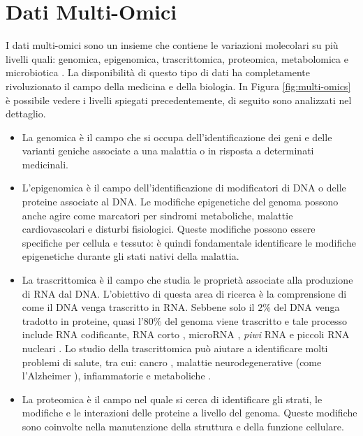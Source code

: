 \documentclass[12pt,italian]{report}
\begin{document}
	\section{Dati Multi-Omici}
	I dati multi-omici sono un insieme che contiene le variazioni molecolari su più livelli quali: genomica, epigenomica, trascrittomica, proteomica, metabolomica e microbiotica \cite{Hasin2017}. La disponibilità di questo tipo di dati ha completamente rivoluzionato il campo della medicina e della biologia. 
	In Figura \ref{fig:multi-omics} è possibile vedere i livelli spiegati precedentemente, di seguito sono analizzati nel dettaglio.
	\begin{itemize}
		\item La genomica è il campo che si occupa dell'identificazione dei geni e delle varianti geniche associate a una malattia o in risposta a determinati medicinali.
		
		\item L'epigenomica è il campo dell'identificazione di modificatori di DNA o delle proteine associate al DNA. Le modifiche epigenetiche del genoma possono anche agire come marcatori per sindromi metaboliche, malattie cardiovascolari e disturbi fisiologici. Queste modifiche possono essere specifiche per cellula e tessuto: è quindi fondamentale identificare le modifiche epigenetiche durante gli stati nativi della malattia.
		
		\item La trascrittomica è il campo che studia le proprietà associate alla produzione di RNA dal DNA. L'obiettivo di questa area di ricerca è la comprensione di come il DNA venga trascritto in RNA. Sebbene solo il $2\%$ del DNA venga tradotto in proteine, quasi l'$80\%$ del genoma viene trascritto e tale processo include RNA codificante, RNA corto \cite{lee2004short}, microRNA \cite{lu2018microrna}, \textit{piwi} RNA \cite{ozata2019piwi} e piccoli RNA nucleari \cite{cullen2003nuclear}. Lo studio della trascrittomica può aiutare a identificare molti problemi di salute, tra cui: cancro \cite{sager2015transcriptomics}, malattie neurodegenerative (come l'Alzheimer \cite{papassotiropoulos2006genetics}), infiammatorie \cite{chan2018delineating} e metaboliche \cite{stenton2020diagnosis}.
		
		\item  La proteomica è il campo nel quale si cerca di identificare gli strati, le modifiche e le interazioni delle proteine a livello del genoma. Queste modifiche sono coinvolte nella manutenzione della struttura e della funzione cellulare. 
		

\end{itemize}
\end{document}
